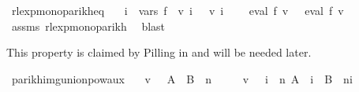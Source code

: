 \begin{isabellebody}
\endisatagproof
{\isafoldproof}%
%
\isadelimproof
\isanewline
%
\endisadelimproof
\isanewline
{}\isamarkupfalse%
\ rlexp{\isacharunderscore}{\kern0pt}mono{\isacharunderscore}{\kern0pt}parikh{\isacharunderscore}{\kern0pt}eq{\isacharcolon}{\kern0pt}\isanewline
\ \ \ {\isachardoublequoteopen}{\isasymforall}i\ {\isasymin}\ vars\ f{\isachardot}{\kern0pt}\ {\isasymPsi}\ {\isacharparenleft}{\kern0pt}v\ i{\isacharparenright}{\kern0pt}\ {\isacharequal}{\kern0pt}\ {\isasymPsi}\ {\isacharparenleft}{\kern0pt}v{\isacharprime}{\kern0pt}\ i{\isacharparenright}{\kern0pt}{\isachardoublequoteclose}\isanewline
\ \ \ {\isachardoublequoteopen}{\isasymPsi}\ {\isacharparenleft}{\kern0pt}eval\ f\ v{\isacharparenright}{\kern0pt}\ {\isacharequal}{\kern0pt}\ {\isasymPsi}\ {\isacharparenleft}{\kern0pt}eval\ f\ v{\isacharprime}{\kern0pt}{\isacharparenright}{\kern0pt}{\isachardoublequoteclose}\isanewline
%
\isadelimproof
\ \ %
\endisadelimproof
%
\isatagproof
{}\isamarkupfalse%
\ assms\ rlexp{\isacharunderscore}{\kern0pt}mono{\isacharunderscore}{\kern0pt}parikh\ \isamarkupfalse%
\ blast%
\endisatagproof
{\isafoldproof}%
%
\isadelimproof
%
\endisadelimproof
%
\isadelimdocument
%
\endisadelimdocument
%
\isatagdocument
%
\isamarkuptrue%
%
\endisatagdocument
{\isafolddocument}%
%
\isadelimdocument
%
\endisadelimdocument
%
\begin{isamarkuptext}%
\label{sec:parikh_img_star}%
\end{isamarkuptext}\isamarkuptrue%
%
\begin{isamarkuptext}%
This property is claimed by Pilling in \cite{Pilling} and will be needed later.%
\end{isamarkuptext}\isamarkuptrue%
\isamarkupfalse%
\ parikh{\isacharunderscore}{\kern0pt}img{\isacharunderscore}{\kern0pt}union{\isacharunderscore}{\kern0pt}pow{\isacharunderscore}{\kern0pt}aux{}{\isacharcolon}{\kern0pt}\isanewline
\ \ \ {\isachardoublequoteopen}v\ {\isasymin}\ {\isasymPsi}\ {\isacharparenleft}{\kern0pt}{\isacharparenleft}{\kern0pt}A\ {\isasymunion}\ B{\isacharparenright}{\kern0pt}\ {\isacharcircum}{\kern0pt}{\isacharcircum}{\kern0pt}\ n{\isacharparenright}{\kern0pt}{\isachardoublequoteclose}\isanewline
\ \ \ \ \ {\isachardoublequoteopen}v\ {\isasymin}\ {\isasymPsi}\ {\isacharparenleft}{\kern0pt}{\isasymUnion}i\ {\isasymle}\ n{\isachardot}{\kern0pt}\ A\ {\isacharcircum}{\kern0pt}{\isacharcircum}{\kern0pt}\ i\ {\isacharat}{\kern0pt}{\isacharat}{\kern0pt}\ B\ {\isacharcircum}{\kern0pt}{\isacharcircum}{\kern0pt}\ {\isacharparenleft}{\kern0pt}n{\isacharminus}{\kern0pt}i{\isacharparenright}{\kern0pt}{\isacharparenright}{\kern0pt}{\isachardoublequoteclose}\isanewline

\end{isabellebody}
